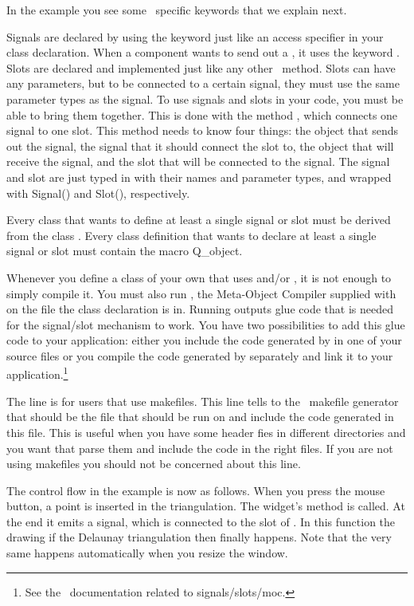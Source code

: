 In the example you see some \qt\ specific keywords that we explain
next.

Signals are declared by using the keyword  just like an
access specifier in your class declaration. When a component wants to
send out a , it uses the keyword . Slots are
declared and implemented just like any other \CC\ method. Slots can
have any parameters, but to be connected to a certain signal, they
must use the same parameter types as the signal. To use signals and
slots in your code, you must be able to bring them together. This is
done with the method , which connects one
signal to one slot. This method needs to know four things: the object
that sends out the signal, the signal that it should connect the slot
to, the object that will receive the signal, and the slot that will be 
connected to the signal. The signal and slot are just typed in with
their names and parameter types, and wrapped with {\sc Signal()} and
{\sc Slot()}, respectively.

Every class that wants to define at least a single signal or slot must 
be derived from the class . Every class definition that
wants to declare at least a single signal or slot must contain the
macro {\sc Q\_object}.

Whenever you define a class of your own that uses  and/or
, it is not enough to simply compile it. You must also run
, the Meta-Object Compiler supplied with \qt\, on the file
the class declaration is in. Running  outputs glue code that
is needed for the signal/slot mechanism to work. You have two
possibilities to add this glue code to your application: either you
include the code generated by  in one of your source files or 
you compile the code generated by  separately and link it to your
application.\footnote{See the \qt\ documentation related to signals/slots/moc.}

The line  is for users that use
makefiles. This line tells to the \cgal\ makefile generator that
 should be the file that  should be run on
and include the code generated in this file. This is useful when you
have some header fies in different directories and you want that
 parse them and include the code in the right files. If you
are not using makefiles you should not be concerned about this line.

The control flow in the example is now as follows. When you press the
mouse button, a point is inserted in the triangulation.  The widget's
method  is called. At the end it emits a signal, which is
connected to the slot of . In this
function the drawing if the Delaunay triangulation then finally
happens.  Note that the very same happens automatically when you
resize the window.


